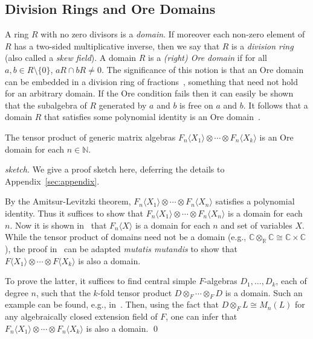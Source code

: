 \documentclass[runningheads]{llncs}
\begin{document}
\subsection{Division Rings and Ore Domains}
A ring $R$ with no zero divisors is a \emph{domain}.  If moreover each
non-zero element of $R$ has a two-sided multiplicative inverse, then we
say that $R$ is a \emph{division ring} (also called a
\emph{skew field}).  A domain $R$ is a \emph{(right) Ore domain}
if for all $a,b \in R \setminus \{0\}$, $aR \cap bR \neq 0$.  The
significance of this notion is that an Ore domain can be embedded in a
division ring of fractions~\cite[Corollary 7.1.6]{Cohn03}, something
that need not hold for an arbitrary domain.  If the Ore condition
fails then it can easily be shown that the subalgebra of $R$ generated
by $a$ and $b$ is free on $a$ and $b$.  It follows that a domain $R$
that satisfies some polynomial identity is an Ore
domain~\cite[Corollary 7.5.2]{Cohn03}.

\begin{proposition}
  The tensor product of generic matrix algebras
  $F_n\langle X_1\rangle \otimes \cdots \otimes F_n\langle X_k\rangle$
  is an Ore domain for each $n \in \mathbb{N}$.
\label{prop:ore}
\end{proposition}
\begin{proof}[sketch]
  We give a proof sketch here, deferring the details to
  Appendix~\ref{sec:appendix}.

By the Amitsur-Levitzki theorem, $F_n\langle X_1 \rangle \otimes
\cdots \otimes F_n \langle X_n \rangle$ satisfies a polynomial
identity.  Thus it suffices to show that $F_n\langle X_1 \rangle
\otimes \cdots \otimes F_n \langle X_n \rangle$ is a domain for each
$n$.  Now it is shown in~\cite[Proposition 7.7.2]{Cohn03} that
$F_n\langle X\rangle$ is a domain for each $n$ and set of variables
$X$.  While the tensor product of domains need not be a domain (e.g.,
$\mathbb{C} \otimes_{\mathbb{R}} \mathbb{C} \cong \mathbb{C} \times
\mathbb{C}$), the proof in~\cite{Cohn03} can be adapted \emph{mutatis
  mutandis} to show that $F \langle X_1 \rangle \otimes \cdots \otimes
F \langle X_k \rangle$ is also a domain.

To prove the latter, it suffices to find central simple $F$-algebras
$D_1,\ldots,D_k$, each of degree $n$, such that the $k$-fold tensor
product $D\otimes_F \cdots \otimes_F D$ is a domain.  Such an example
can be found, e.g., in~\cite[Proposition 1.1]{Saltman}.  Then, using
the fact that $D \otimes_F L \cong M_n(L)$ for any algebraically
closed extension field of $F$, one can infer that $F_n \langle X_1
\rangle \otimes \cdots \otimes F_n \langle X_k \rangle$ is also a
domain.  \qed
\end{proof}
\end{document}
